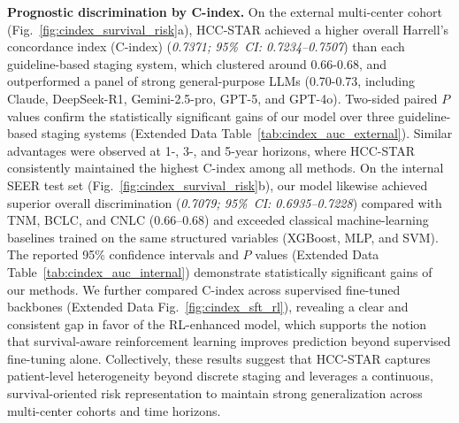 \documentclass{article}
\begin{document}
\textbf{Prognostic discrimination by C-index.}
On the external multi-center cohort (Fig.~\ref{fig:cindex_survival_risk}a), HCC-STAR achieved a higher overall Harrell’s concordance index (C-index) (\textit{0.7371; 95\%~CI: 0.7234–0.7507}) than each guideline-based staging system, which clustered around 0.66-0.68, and outperformed a panel of strong general-purpose LLMs (0.70-0.73, including Claude, DeepSeek-R1, Gemini-2.5-pro, GPT-5, and GPT-4o). Two-sided paired $P$ values confirm the statistically significant gains of our model over three guideline-based staging systems (Extended Data Table~\ref{tab:cindex_auc_external}). Similar advantages were observed at 1-, 3-, and 5-year horizons, where HCC-STAR consistently maintained the highest C-index among all methods. On the internal SEER test set (Fig.~\ref{fig:cindex_survival_risk}b), our model likewise achieved superior overall discrimination (\textit{0.7079; 95\%~CI: 0.6935–0.7228}) compared with TNM, BCLC, and CNLC (0.66–0.68) and exceeded classical machine-learning baselines trained on the same structured variables (XGBoost, MLP, and SVM). The reported 95\% confidence intervals and $P$ values (Extended Data Table~\ref{tab:cindex_auc_internal}) demonstrate statistically significant gains of our methods. We further compared C-index across supervised fine-tuned backbones (Extended Data Fig.~\ref{fig:cindex_sft_rl}), revealing a clear and consistent gap in favor of the RL-enhanced model, which supports the notion that survival-aware reinforcement learning improves prediction beyond supervised fine-tuning alone. Collectively, these results suggest that HCC-STAR captures patient-level heterogeneity beyond discrete staging and leverages a continuous, survival-oriented risk representation to maintain strong generalization across multi-center cohorts and time horizons.
\end{document}
